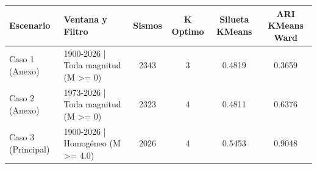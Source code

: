 \begin{tabular}{lp{6cm}cccc}
\toprule
Escenario & Ventana y Filtro & Sismos & K Optimo & Silueta KMeans & ARI KMeans Ward \\
\midrule
Caso 1 (Anexo) & 1900-2026 | Toda magnitud (M >= 0) & 2343 & 3 & 0.4819 & 0.3659 \\
Caso 2 (Anexo) & 1973-2026 | Toda magnitud (M >= 0) & 2323 & 4 & 0.4811 & 0.6376 \\
Caso 3 (Principal) & 1900-2026 | Homogéneo (M >= 4.0) & 2026 & 4 & 0.5453 & 0.9048 \\
\bottomrule
\end{tabular}